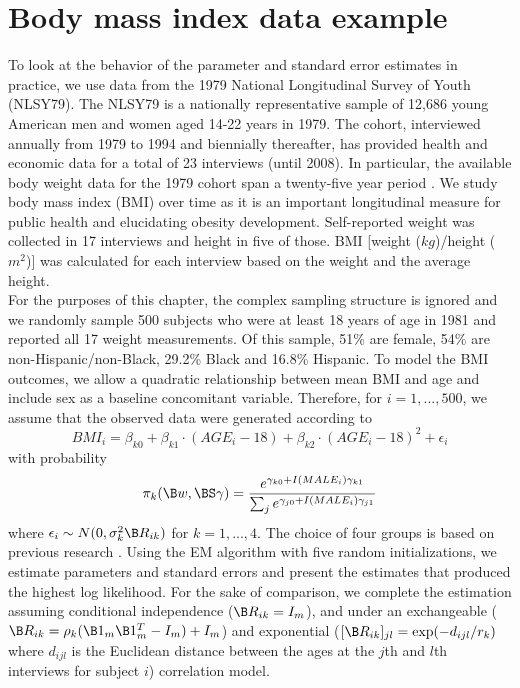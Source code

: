 \section{Body mass index data example} \label{chp2:data}
To look at the behavior of the parameter and standard error estimates in practice, we use data from the 1979 National Longitudinal Survey of Youth (NLSY79). The NLSY79 is a nationally representative sample of 12,686 young American men and women aged 14-22 years in 1979. The cohort, interviewed annually from 1979 to 1994 and biennially thereafter, has provided health and economic data for a total of 23 interviews (until 2008).  In particular, the available body weight data for the 1979 cohort span a twenty-five year period \cite{ostbye2011}. We study body mass index (BMI) over time as it is an important longitudinal measure for public health and elucidating obesity development.  Self-reported weight was collected in 17 interviews and height in five of those. BMI [weight ($kg$)/height ($m^{2}$)] was calculated for each interview based on the weight and the average height.\\

For the purposes of this chapter, the complex sampling structure is ignored and we randomly sample 500 subjects who were at least 18 years of age in 1981 and reported all 17 weight measurements. Of this sample, 51\% are female, 54\% are non-Hispanic/non-Black, 29.2\% Black and 16.8\% Hispanic. To model the BMI outcomes, we allow a quadratic relationship between mean BMI and age and include sex as a baseline concomitant variable. Therefore, for $i=1,...,500$, we assume that the observed data were generated according to
$$BMI_{i}=\beta_{k0}+\beta_{k1}\cdot (AGE_{i}-18)+\beta_{k2}\cdot (AGE_{i}-18)^{2}+\epsilon_{i}$$
with probability
$$\pi_{k}(\B w,\BS\gamma)=\frac{e^{\gamma_{k0}+I(MALE_{i})\gamma_{k1}}}{\sum_{j}e^{\gamma_{j0}+I(MALE_{i})\gamma_{j1}}}$$
where $\epsilon_{i}\sim N(0,\sigma_{k}^{2}\B R_{ik})$
for $k=1,...,4$. The choice of four groups is based on previous research \cite{ostbye2011}. Using the EM algorithm with five random initializations, we estimate parameters and standard errors and present the estimates that produced the highest log likelihood. For the sake of comparison, we complete the estimation assuming conditional independence ($\B R_{ik}  = I_m$), and under an exchangeable ($\B R_{ik} = \rho_k(\B 1_m\B 1_{m}^{T} - I_m)+I_m$) and exponential ($[\B R_{ik}]_{jl} = \exp(-d_{ijl}/r_k)$ where $d_{ijl}$ is the Euclidean distance between the ages at the $j$th and $l$th interviews for subject $i$) correlation model.
